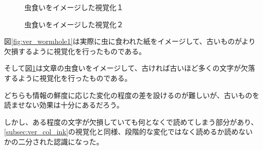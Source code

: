 \begin{figure}[htbp]
  \begin{minipage}{0.5\hsize}
    \begin{center}
    \end{center}
    \caption{虫食いをイメージした視覚化１}
    \label{fig:ver_wormhole1}
  \end{minipage}
  \begin{minipage}{0.5\hsize}
    \begin{center}
    \end{center}
    \caption{虫食いをイメージした視覚化２}
    \label{fig:ver_wormhole2}
  \end{minipage}
\end{figure}

図\ref{fig:ver_wormhole1}は実際に虫に食われた紙をイメージして、古いものがより欠損するように視覚化を行ったものである。

そして図\ref{fig:ver_wormhole2}は文章の虫食いをイメージして、古ければ古いほど多くの文字が欠落するように視覚化を行ったものである。

どちらも情報の鮮度に応じた変化の程度の差を設けるのが難しいが、古いものを読ませない効果は十分にあるだろう。

しかし、ある程度の文字が欠損していても何となくで読めてしまう部分があり、\ref{subsec:ver_col_ink}の視覚化と同様、段階的な変化ではなく読めるか読めないかの二分された認識になった。

